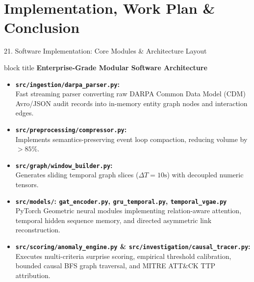 \documentclass[aspectratio=169,10pt]{beamer}
\begin{document}
\section{Implementation, Work Plan \& Conclusion}

\begin{frame}{21. Software Implementation: Core Modules \& Architecture Layout}
\vspace{0.15em}
\begin{beamercolorbox}[rounded=true,shadow=false,sep=0.35em,wd=\textwidth]{block title}
\textbf{\scriptsize Enterprise-Grade Modular Software Architecture}
\end{beamercolorbox}
\vspace{0.15em}
{\fontsize{7.5pt}{10.8pt}\selectfont
\begin{itemize}\itemsep0.25em
  \item \textbf{\texttt{src/ingestion/darpa\_parser.py}:}\\
  Fast streaming parser converting raw DARPA Common Data Model (CDM) Avro/JSON audit records into in-memory entity graph nodes and interaction edges.
  \item \textbf{\texttt{src/preprocessing/compressor.py}:}\\
  Implements semantics-preserving event loop compaction, reducing volume by $>85\%$.
  \item \textbf{\texttt{src/graph/window\_builder.py}:}\\
  Generates sliding temporal graph slices ($\Delta T=10\text{s}$) with decoupled numeric tensors.
  \item \textbf{\texttt{src/models/}: \texttt{gat\_encoder.py}, \texttt{gru\_temporal.py}, \texttt{temporal\_vgae.py}}\\
  PyTorch Geometric neural modules implementing relation-aware attention, temporal hidden sequence memory, and directed asymmetric link reconstruction.
  \item \textbf{\texttt{src/scoring/anomaly\_engine.py} \& \texttt{src/investigation/causal\_tracer.py}:}\\
  Executes multi-criteria surprise scoring, empirical threshold calibration, bounded causal BFS graph traversal, and MITRE ATT\&CK TTP attribution.
\end{itemize}
}
\end{frame}
\end{document}

